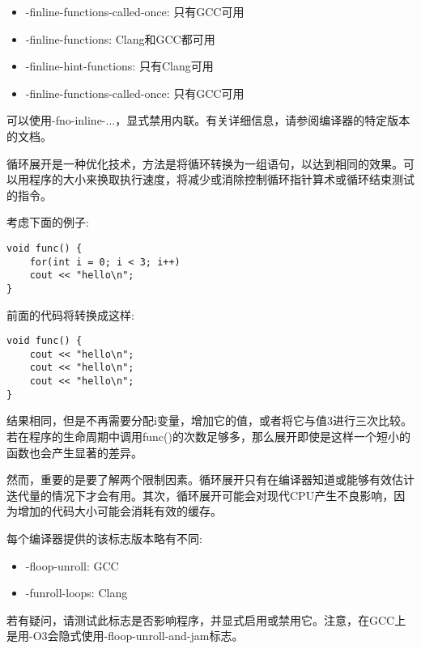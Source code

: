 \begin{itemize}
\item 
-finline-functions-called-once: 只有GCC可用

\item 
-finline-functions: Clang和GCC都可用

\item 
-finline-hint-functions: 只有Clang可用

\item 
-finline-functions-called-once: 只有GCC可用
\end{itemize}

可以使用-fno-inline-...，显式禁用内联。有关详细信息，请参阅编译器的特定版本的文档。


循环展开是一种优化技术，方法是将循环转换为一组语句，以达到相同的效果。可以用程序的大小来换取执行速度，将减少或消除控制循环指针算术或循环结束测试的指令。

考虑下面的例子:

\begin{lstlisting}[style=styleCXX]
void func() {
	for(int i = 0; i < 3; i++)
	cout << "hello\n";
}
\end{lstlisting}

前面的代码将转换成这样:

\begin{lstlisting}[style=styleCXX]
void func() {
	cout << "hello\n";
	cout << "hello\n";
	cout << "hello\n";
}
\end{lstlisting}

结果相同，但是不再需要分配i变量，增加它的值，或者将它与值3进行三次比较。若在程序的生命周期中调用func()的次数足够多，那么展开即使是这样一个短小的函数也会产生显著的差异。

然而，重要的是要了解两个限制因素。循环展开只有在编译器知道或能够有效估计迭代量的情况下才会有用。其次，循环展开可能会对现代CPU产生不良影响，因为增加的代码大小可能会消耗有效的缓存。

每个编译器提供的该标志版本略有不同:

\begin{itemize}
\item 
-floop-unroll: GCC

\item 
-funroll-loops: Clang
\end{itemize}

若有疑问，请测试此标志是否影响程序，并显式启用或禁用它。注意，在GCC上是用-O3会隐式使用-floop-unroll-and-jam标志。

